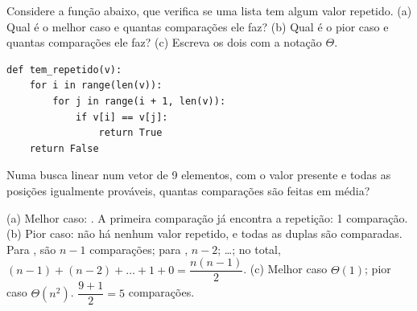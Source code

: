 \begin{exrapido}[18]
Considere a função abaixo, que verifica se uma lista tem algum valor repetido.
(a) Qual é o melhor caso e quantas comparações ele faz? (b) Qual é o pior caso e quantas
comparações ele faz? (c) Escreva os dois com a notação $\Theta$.

\begin{lstlisting}
def tem_repetido(v):
    for i in range(len(v)):
        for j in range(i + 1, len(v)):
            if v[i] == v[j]:
                return True
    return False
\end{lstlisting}
\end{exrapido}

\begin{exrapido}
Numa busca linear num vetor de 9 elementos, com o valor presente e todas as posições igualmente
prováveis, quantas comparações são feitas em média?
\end{exrapido}

\begin{respostas}
   (a) Melhor caso: . A primeira comparação já encontra a
  repetição: 1 comparação. (b) Pior caso: não há nenhum valor repetido, e todas as duplas são
  comparadas. Para , são $n - 1$ comparações; para , $n - 2$; \dots;
  no total, $(n-1) + (n-2) + \dots + 1 + 0 = \dfrac{n(n-1)}{2}$. (c) Melhor caso $\Theta(1)$;
  pior caso $\Theta(n^2)$.
   $\dfrac{9 + 1}{2} = 5$ comparações.
\end{respostas}
